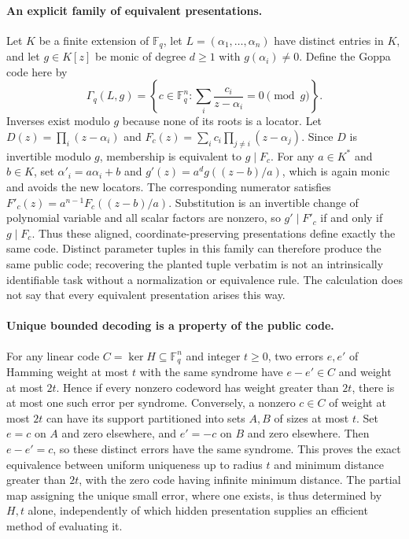 \documentclass[11pt]{article}
\begin{document}
\paragraph{An explicit family of equivalent presentations.}
Let $K$ be a finite extension of $\mathbb F_q$, let
$L=(\alpha_1,\ldots,\alpha_n)$ have distinct entries in $K$, and let
$g\in K[z]$ be monic of degree $d\ge1$ with $g(\alpha_i)\ne0$.
Define the Goppa code here by
\[
\Gamma_q(L,g)=\left\{c\in\mathbb F_q^n:
\sum_i\frac{c_i}{z-\alpha_i}=0\pmod g\right\}.
\]
Inverses exist modulo $g$ because none of its roots is a locator.
Let $D(z)=\prod_i(z-\alpha_i)$ and
$F_c(z)=\sum_i c_i\prod_{j\ne i}(z-\alpha_j)$.
Since $D$ is invertible modulo $g$, membership is equivalent to $g\mid F_c$.
For any $a\in K^*$ and $b\in K$, set
$\alpha'_i=a\alpha_i+b$ and
$g'(z)=a^d g((z-b)/a)$, which is again monic and avoids the new locators.
The corresponding numerator satisfies
$F'_c(z)=a^{n-1}F_c((z-b)/a)$.
Substitution is an invertible change of polynomial variable and all scalar
factors are nonzero, so $g'\mid F'_c$ if and only if $g\mid F_c$.
Thus these aligned, coordinate-preserving presentations define exactly the
same code. Distinct parameter tuples in this family can therefore produce
the same public code; recovering the planted tuple verbatim is not an
intrinsically identifiable task without a normalization or equivalence rule.
The calculation does not say that every equivalent presentation arises this way.

\paragraph{Unique bounded decoding is a property of the public code.}
For any linear code $C=\ker H\subseteq\mathbb F_q^n$ and integer $t\ge0$,
two errors $e,e'$ of Hamming weight at most $t$ with the same syndrome have
$e-e'\in C$ and weight at most $2t$. Hence if every nonzero codeword has
weight greater than $2t$, there is at most one such error per syndrome.
Conversely, a nonzero $c\in C$ of weight at most $2t$ can have its support
partitioned into sets $A,B$ of sizes at most $t$. Set $e=c$ on $A$ and zero
elsewhere, and $e'=-c$ on $B$ and zero elsewhere. Then $e-e'=c$, so these
distinct errors have the same syndrome. This proves the exact equivalence
between uniform uniqueness up to radius $t$ and minimum distance greater
than $2t$, with the zero code having infinite minimum distance.
The partial map assigning the unique small error, where one exists, is thus
determined by $H,t$ alone, independently of which hidden presentation supplies
an efficient method of evaluating it.
\end{document}
